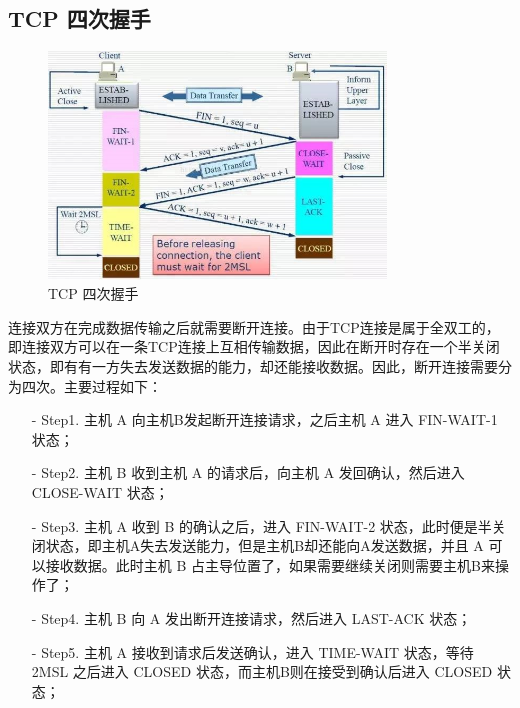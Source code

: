 \subsection{TCP 四次握手}

\begin{figure}[htb]
\centering 
\includegraphics[width=0.80\textwidth]{img/newch1m4.png} 
\caption{TCP 四次握手}
\label{Test}
\end{figure}

连接双方在完成数据传输之后就需要断开连接。由于TCP连接是属于全双工的，即连接双方可以在一条TCP连接上互相传输数据，因此在断开时存在一个半关闭状态，即有有一方失去发送数据的能力，却还能接收数据。因此，断开连接需要分为四次。主要过程如下：

\begin{itemize}
\item [-] Step1. 主机 A 向主机B发起断开连接请求，之后主机 A 进入 FIN-WAIT-1 状态；
\item [-] Step2. 主机 B 收到主机 A 的请求后，向主机 A 发回确认，然后进入 CLOSE-WAIT 状态；
\item [-] Step3. 主机 A 收到 B 的确认之后，进入 FIN-WAIT-2 状态，此时便是半关闭状态，即主机A失去发送能力，但是主机B却还能向A发送数据，并且 A 可以接收数据。此时主机 B 占主导位置了，如果需要继续关闭则需要主机B来操作了；
\item [-] Step4. 主机 B 向 A 发出断开连接请求，然后进入 LAST-ACK 状态；
\item [-] Step5. 主机 A 接收到请求后发送确认，进入 TIME-WAIT 状态，等待 2MSL 之后进入 CLOSED 状态，而主机B则在接受到确认后进入 CLOSED 状态；
\end{itemize}

